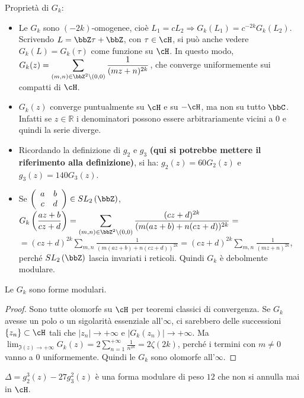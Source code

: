\begin{osservazione}
Proprietà di $G_k$:

\begin{itemize}
\item Le $G_k$ sono $(-2k)$-omogenee, cioè
$L_1=cL_2 \Rightarrow G_k(L_1)=c^{-2k}G_k(L_2)$.
Scrivendo $L=\bbZ \tau + \bbZ$, con $\tau \in \cH$,
si può anche vedere $G_k(L) = G_k(\tau)$ come funzione su $\cH$.
In questo modo, $\displaystyle{G_k(z)=\sum_{(m,n) \in \bbZ^2 \setminus
(0,0)}{\frac{1}{(mz+n)^{2k}}}}$, che converge uniformemente sui compatti
di $\cH$.
\item $G_k(z)$ converge puntualmente su $\cH$ e su $-\cH$, ma non su tutto $\bbC$. Infatti se $z \in \mathbb{R}$ i denominatori possono
essere arbitrariamente vicini a $0$ e quindi la serie diverge.
\item Ricordando la definizione di $g_2$ e $g_3$ \textbf{\textcolor[rgb]{1,0,0}{(qui si potrebbe mettere il riferimento alla definizione)}}, si ha: $g_2(z)=60G_2(z)$ e $g_3(z)=140G_3(z)$.
\item Se $\left( \begin{array}{cc} a & b \\ c & d \end{array} \right) \in
SL_2 \left( \bbZ \right)$,
$\displaystyle{ G_k \left(\frac{az+b}{cz+d} \right) = 
\sum_{(m,n) \in \bbZ^2 \setminus (0,0)}
{\frac{(cz+d)^{2k}} {(m(az+b)+n(cz+d))^{2k}}} =}$
$\displaystyle{ =(cz+d)^{2k} \sum_{m,n}{\frac{1} {(m(az+b)+n(cz+d))^{2k}}} =
(cz+d)^{2k} \sum_{m,n}{\frac{1}{(mz+n)^{2k}}} }$, perché
$SL_2 \left( \bbZ \right)$ lascia invariati i reticoli. Quindi $G_k$
è debolmente modulare.
\end{itemize}
\end{osservazione}


\begin{proposizione}
Le $G_k$ sono forme modulari.
\end{proposizione}

\begin{proof}
Sono tutte olomorfe su $\cH$ per teoremi classici di convergenza.
Se $G_k$ avesse un polo o un sigolarità essenziale all'$\infty$, ci sarebbero
delle successioni $\{ z_n \} \subset \cH$ tali che
$|z_n| \rightarrow +\infty$ e $|G_k(z_n)| \rightarrow +\infty$.
Ma $\displaystyle{\lim_{\Im(z) \rightarrow +\infty} G_k(z)=
2 \sum_{n=1}^{+\infty}{\frac{1}{n^{2k}}} = 2 \zeta(2k)}$, perché i termini
con $m \neq 0$ vanno a $0$ uniformemente. Quindi le $G_k$ sono olomorfe
all'$\infty$.
\end{proof}

\begin{osservazione}
$\Delta = g_2 ^3 (z) - 27 g_3 ^2 (z)$ è una forma modulare di peso $12$ che
non si annulla mai in $\cH$.
\end{osservazione}